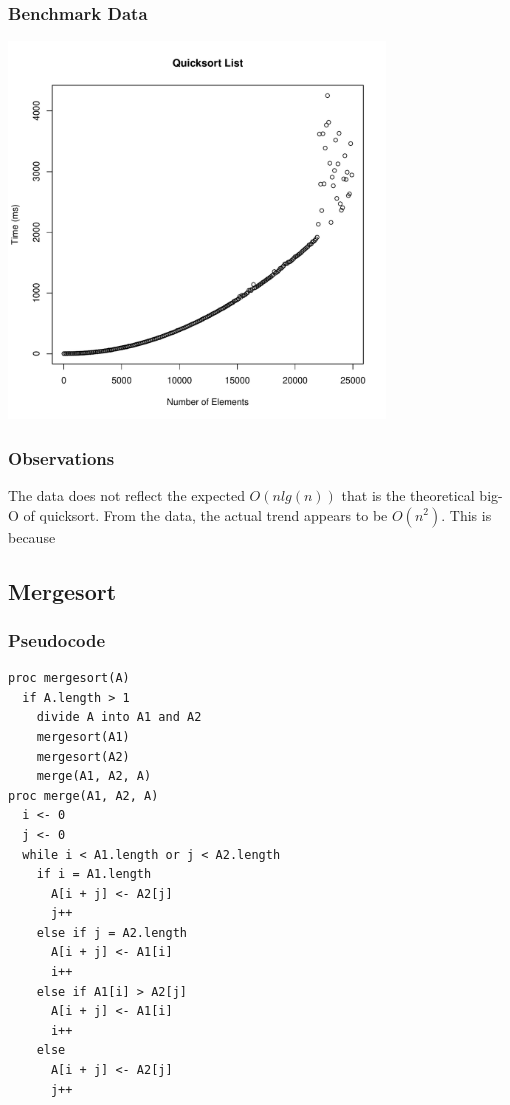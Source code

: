 \documentclass[a4paper,12pt]{article}
\begin{document}
\subsubsection{Benchmark Data}
\includegraphics[height=10cm]{quicksort_list}
\subsubsection{Observations}
The data does not reflect the expected $O(nlg(n))$ that is the theoretical big-O of quicksort. From the data, the actual trend
appears to be $O(n^2)$. This is because 
\subsection{Mergesort}
\subsubsection{Pseudocode}
\begin{verbatim}
proc mergesort(A)
  if A.length > 1
    divide A into A1 and A2
    mergesort(A1)
    mergesort(A2)
    merge(A1, A2, A)
proc merge(A1, A2, A)
  i <- 0
  j <- 0
  while i < A1.length or j < A2.length
    if i = A1.length
      A[i + j] <- A2[j]
      j++
    else if j = A2.length
      A[i + j] <- A1[i]
      i++
    else if A1[i] > A2[j]
      A[i + j] <- A1[i]
      i++
    else 
      A[i + j] <- A2[j]
      j++     
\end{verbatim}
\end{document}
